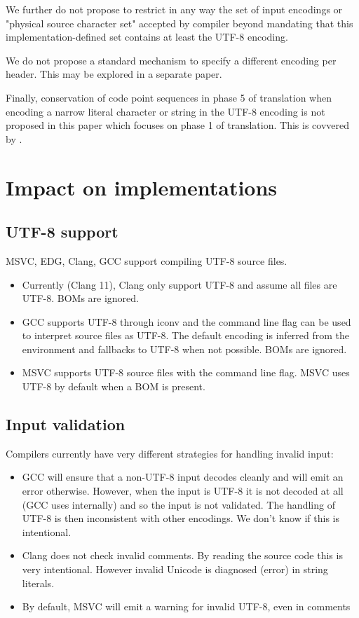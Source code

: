 \documentclass{wg21}
\begin{document}
We further do not propose to restrict in any way the set of input encodings or "physical source character set"
accepted by compiler beyond mandating that this implementation-defined set contains at least the UTF-8 encoding.

We do not propose a standard mechanism to specify a different encoding per header. This may be explored in a separate paper.

Finally, conservation of code point sequences in phase 5 of translation when encoding a narrow literal character or string in the UTF-8
encoding is not proposed in this paper which focuses on phase 1 of translation.
This is covvered by .




\section{Impact on implementations}

\subsection{UTF-8 support}
MSVC, EDG, Clang, GCC support compiling UTF-8 source files.

\begin{itemize}
\item Currently (Clang 11), Clang only support UTF-8 and assume all files are UTF-8. BOMs are ignored.
\item GCC supports UTF-8 through iconv and the command line flag  can be used to interpret source files as UTF-8.
The default encoding is inferred from the environment and fallbacks to UTF-8 when not possible. BOMs are ignored.
\item MSVC supports UTF-8 source files with the  command line flag. MSVC uses UTF-8 by default when a BOM is present.
\end{itemize}


\subsection{Input validation}

Compilers currently have very different strategies for handling invalid input:

\begin{itemize}
\item GCC will ensure that a non-UTF-8 input decodes cleanly and will emit an error otherwise. However, when the input is UTF-8 it is
not decoded at all (GCC uses internally) and so the input is not validated. The handling of UTF-8 is then inconsistent with other encodings.
We don't know if this is intentional.
\item Clang does not check invalid comments. By reading the source code this is very intentional. However invalid Unicode is diagnosed (error) in string literals.
\item By default, MSVC will emit a warning for invalid UTF-8, even in comments
\end{itemize}
\end{document}
